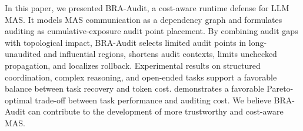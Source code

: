 \documentclass[letterpaper]{article} %
\begin{document}
In this paper, we presented BRA-Audit, a cost-aware runtime defense for LLM MAS. It models MAS communication as a dependency graph and formulates auditing as cumulative-exposure audit point placement. By combining audit gaps with topological impact, BRA-Audit selects limited audit points in long-unaudited and influential regions, shortens audit contexts, limits unchecked propagation, and localizes rollback. Experimental results on structured coordination, complex reasoning, and open-ended tasks support a favorable balance between task recovery and token cost. demonstrates a favorable Pareto-optimal trade-off between task performance and auditing cost.  We believe BRA-Audit can contribute to the development of more trustworthy and cost-aware MAS.



% 
\end{document}
